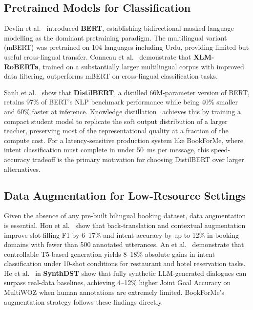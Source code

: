 \subsection{Pretrained Models for Classification}

Devlin et al.~\cite{devlin2019} introduced \textbf{BERT}, establishing
bidirectional masked language modelling as the dominant pretraining paradigm.
The multilingual variant (mBERT) was pretrained on 104 languages including
Urdu, providing limited but useful cross-lingual transfer. Conneau et
al.~\cite{conneau2020} demonstrate that \textbf{XLM-RoBERTa}, trained on a
substantially larger multilingual corpus with improved data filtering,
outperforms mBERT on cross-lingual classification tasks.

Sanh et al.~\cite{sanh2019} show that \textbf{DistilBERT}, a distilled
66M-parameter version of BERT, retains 97\% of BERT's NLP benchmark
performance while being 40\% smaller and 60\% faster at inference. Knowledge
distillation~\cite{hinton2015} achieves this by training a compact student
model to replicate the soft output distribution of a larger teacher, preserving
most of the representational quality at a fraction of the compute cost. For a
latency-sensitive production system like BookForMe, where intent classification
must complete in under 50~ms per message, this speed-accuracy tradeoff is the
primary motivation for choosing DistilBERT over larger alternatives.

\subsection{Data Augmentation for Low-Resource Settings}

Given the absence of any pre-built bilingual booking dataset, data augmentation
is essential. Hou et al.~\cite{hou2020} show that back-translation and
contextual augmentation improve slot-filling F1 by 6--17\% and intent accuracy
by up to 12\% in booking domains with fewer than 500 annotated utterances. An
et al.~\cite{an2022} demonstrate that controllable T5-based generation yields
8--18\% absolute gains in intent classification under 10-shot conditions for
restaurant and hotel reservation tasks. He et al.~\cite{he2024} in
\textbf{SynthDST} show that fully synthetic LLM-generated dialogues can
surpass real-data baselines, achieving 4--12\% higher Joint Goal Accuracy on
MultiWOZ when human annotations are extremely limited. BookForMe's augmentation
strategy follows these findings directly.

